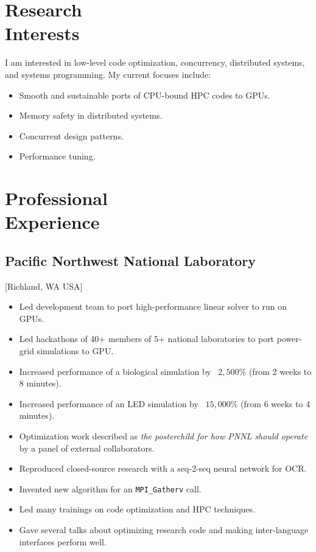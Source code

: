 \documentclass{mycv}
\begin{document}
\maketitle

\section{Research \\ Interests}

I am interested in low-level code optimization, concurrency, distributed systems, and systems programming.
My current focuses include:

\begin{itemize}
  \item Smooth and sustainable ports of CPU-bound HPC codes to GPUs.
  \item Memory safety in distributed systems.
  \item Concurrent design patterns.
  \item Performance tuning.
\end{itemize}

\section{Professional \\ Experience}

\subsection{Pacific Northwest National Laboratory}[Richland, WA USA]
\begin{positions}
\end{positions}

\begin{itemize}
  \item Led development team to port high-performance linear solver to run on GPUs.
  \item Led hackathons of 40+ members of 5+ national laboratories to port power-grid simulations to GPU.
  \item Increased performance of a biological simulation by ~$2,500\%$ (from 2 weeks to 8 minutes).
  \item Increased performance of an LED simulation by ~$15,000\%$ (from 6 weeks to 4 minutes).
  \item Optimization work described as \textit{the posterchild for how PNNL should operate} by a panel of external collaborators.
  \item Reproduced closed-source research with a seq-2-seq neural network for OCR.
  \item Invented new algorithm for an \verb!MPI_Gatherv! call.
  \item Led many trainings on code optimization and HPC techniques.
  \item Gave several talks about optimizing research code and making inter-language interfaces perform well.
\end{itemize}
\end{document}
